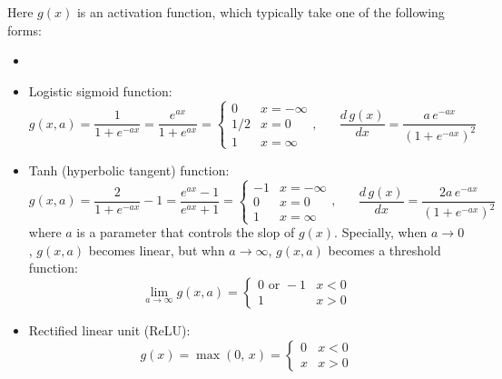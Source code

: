 \documentclass{article}
\begin{document}
Here $g(x)$ is an activation function, which typically take one of the
following forms:
\begin{itemize}
\item 
\item Logistic sigmoid function:
  \begin{equation}  
  g(x,a)=\frac{1}{1+e^{-ax}}=\frac{e^{ax}}{1+e^{ax}}=\left\{\begin{array}{rl}
  0 & x=-\infty \\ 1/2 & x=0 \\ 1 & x=\infty\end{array}\right.,
  \;\;\;\;\;\;
  \frac{d\,g(x)}{dx}=\frac{a\,e^{-ax}}{(1+e^{-ax})^2} 
  \end{equation}
\item Tanh (hyperbolic tangent) function:
  \begin{equation}
    g(x,a)=\frac{2}{1+e^{-ax}}-1=\frac{e^{ax}-1}{e^{ax}+1}
    =\left\{\begin{array}{rl}-1 & x=-\infty \\ 0 & x=0 \\ 1 & x=\infty
    \end{array}\right.,
    \;\;\;\;\;\;
    \frac{d\,g(x)}{dx}=\frac{2a\,e^{-ax}}{(1+e^{-ax})^2} 
  \end{equation}
  where $a$ is a parameter that controls the slop of $g(x)$. Specially, 
  when $a\rightarrow 0$, $g(x,a)$ becomes linear, but whn $a\rightarrow 
  \infty$, $g(x,a)$ becomes a threshold function:
  \begin{equation} 
    \lim_{a\rightarrow\infty} g(x,a)=\left\{ \begin{array}{cl} 0\mbox{ or }-1 & x<0\\
      1 & x>0 \end{array} \right.
  \end{equation}

\item Rectified linear unit (ReLU):
  \begin{equation}
    g(x)=\max(0,\,x)=\left\{\begin{array}{ll}0 & x<0\\x & x>0\end{array}\right.    
  \end{equation}
\end{itemize}

\end{document}
